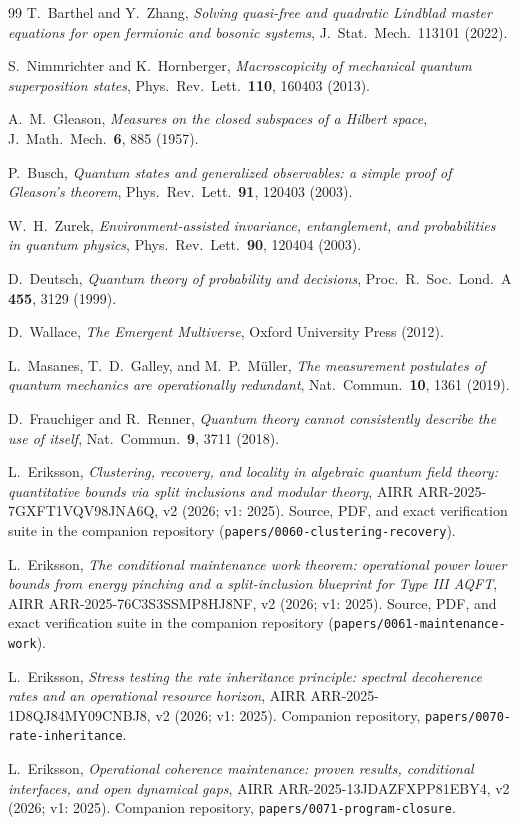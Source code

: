 \documentclass[11pt,a4paper]{article}
\theoremstyle{remark}
\begin{document}
\begin{thebibliography}{99}
 T.~Barthel and Y.~Zhang, \emph{Solving quasi-free and quadratic Lindblad master equations for open fermionic and bosonic systems}, J.~Stat.~Mech.~113101 (2022).

 S.~Nimmrichter and K.~Hornberger, \emph{Macroscopicity of mechanical quantum superposition states}, Phys.~Rev.~Lett.~\textbf{110}, 160403 (2013).

 A.~M.~Gleason, \emph{Measures on the closed subspaces of a Hilbert space}, J.~Math.~Mech.~\textbf{6}, 885 (1957).

 P.~Busch, \emph{Quantum states and generalized observables: a simple proof of Gleason's theorem}, Phys.~Rev.~Lett.~\textbf{91}, 120403 (2003).

 W.~H.~Zurek, \emph{Environment-assisted invariance, entanglement, and probabilities in quantum physics}, Phys.~Rev.~Lett.~\textbf{90}, 120404 (2003).

 D.~Deutsch, \emph{Quantum theory of probability and decisions}, Proc.~R.~Soc.~Lond.~A \textbf{455}, 3129 (1999).

 D.~Wallace, \emph{The Emergent Multiverse}, Oxford University Press (2012).

 L.~Masanes, T.~D.~Galley, and M.~P.~M\"uller, \emph{The measurement postulates of quantum mechanics are operationally redundant}, Nat.~Commun.~\textbf{10}, 1361 (2019).

 D.~Frauchiger and R.~Renner, \emph{Quantum theory cannot consistently describe the use of itself}, Nat.~Commun.~\textbf{9}, 3711 (2018).

 L.~Eriksson, \emph{Clustering, recovery, and locality in algebraic quantum field theory: quantitative bounds via split inclusions and modular theory}, AIRR ARR-2025-7GXFT1VQV98JNA6Q, v2 (2026; v1: 2025). Source, PDF, and exact verification suite in the companion repository (\texttt{papers/0060-clustering-recovery}).

 L.~Eriksson, \emph{The conditional maintenance work theorem: operational power lower bounds from energy pinching and a split-inclusion blueprint for Type III AQFT}, AIRR ARR-2025-76C3S3SSMP8HJ8NF, v2 (2026; v1: 2025). Source, PDF, and exact verification suite in the companion repository (\texttt{papers/0061-maintenance-work}).

 L.~Eriksson, \emph{Stress testing the rate inheritance principle: spectral decoherence rates and an operational resource horizon}, AIRR ARR-2025-1D8QJ84MY09CNBJ8, v2 (2026; v1: 2025). Companion repository, \texttt{papers/0070-rate-inheritance}.

 L.~Eriksson, \emph{Operational coherence maintenance: proven results, conditional interfaces, and open dynamical gaps}, AIRR ARR-2025-13JDAZFXPP81EBY4, v2 (2026; v1: 2025). Companion repository, \texttt{papers/0071-program-closure}.

\end{thebibliography}
\end{document}
